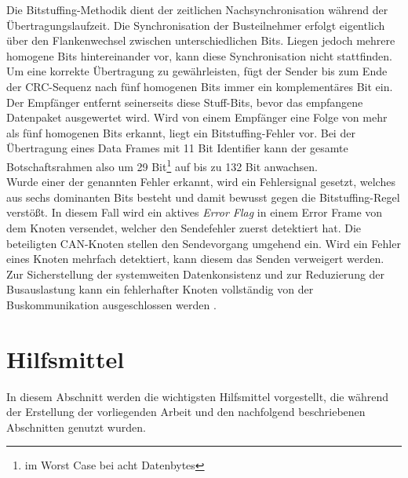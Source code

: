 Die Bitstuffing-Methodik dient der zeitlichen Nachsynchronisation während der Übertragungslaufzeit. Die Synchronisation der Busteilnehmer erfolgt eigentlich über den Flankenwechsel zwischen unterschiedlichen Bits. Liegen jedoch mehrere homogene Bits hintereinander vor, kann diese Synchronisation nicht stattfinden. Um eine korrekte Übertragung zu gewährleisten, fügt der Sender bis zum Ende der \acs{CRC}-Sequenz nach fünf homogenen Bits immer ein komplementäres Bit ein. Der Empfänger entfernt seinerseits diese Stuff-Bits, bevor das empfangene Datenpaket ausgewertet wird. Wird von einem Empfänger eine Folge von mehr als fünf homogenen Bits erkannt, liegt ein Bitstuffing-Fehler vor. Bei der Übertragung eines Data Frames mit 11 Bit Identifier kann der gesamte Botschaftsrahmen also um 29 Bit\footnote{im Worst Case bei acht Datenbytes} auf bis zu 132 Bit anwachsen. \\
Wurde einer der genannten Fehler erkannt, wird ein Fehlersignal gesetzt, welches aus sechs dominanten Bits besteht und damit bewusst gegen die Bitstuffing-Regel verstößt. In diesem Fall wird ein aktives \emph{Error Flag} in einem Error Frame von dem Knoten versendet, welcher den Sendefehler zuerst detektiert hat. Die beteiligten \acs{CAN}-Knoten stellen den Sendevorgang umgehend ein. Wird ein Fehler eines Knoten mehrfach detektiert, kann diesem das Senden verweigert werden. Zur Sicherstellung der systemweiten Datenkonsistenz und zur Reduzierung der Busauslastung kann ein fehlerhafter Knoten vollständig von der Buskommunikation ausgeschlossen werden \cite{Wallentowitz.2011, Zimmermann.2014, VectorInformatikGmbH.}.


\section{Hilfsmittel} \label{sec:Hilfsmittel} %
In diesem Abschnitt werden die wichtigsten Hilfsmittel vorgestellt, die während der Erstellung der vorliegenden Arbeit und den nachfolgend beschriebenen Abschnitten genutzt wurden.

